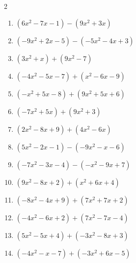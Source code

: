 \begin{multicols}{2}
\begin{enumerate}
  \item $(6x^{2}-7x-1)-(9x^{2}+3x)$


  \item $(-9x^{2}+2x-5)-(-5x^{2}-4x+3)$


  \item $(3x^{2}+x)+(9x^{2}-7)$


  \item $(-4x^{2}-5x-7)+(x^{2}-6x-9)$


  \item $(-x^{2}+5x-8)+(9x^{2}+5x+6)$


  \item $(-7x^{2}+5x)+(9x^{2}+3)$


  \item $(2x^{2}-8x+9)+(4x^{2}-6x)$


  \item $(5x^{2}-2x-1)-(-9x^{2}-x-6)$


  \item $(-7x^{2}-3x-4)-(-x^{2}-9x+7)$


  \item $(9x^{2}-8x+2)+(x^{2}+6x+4)$


  \item $(-8x^{2}-4x+9)+(7x^{2}+7x+2)$


  \item $(-4x^{2}-6x+2)+(7x^{2}-7x-4)$


  \item $(5x^{2}-5x+4)+(-3x^{2}-8x+3)$


  \item $(-4x^{2}-x-7)+(-3x^{2}+6x-5)$


\end{enumerate}
\end{multicols}
